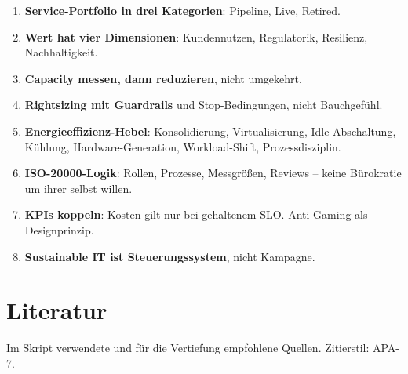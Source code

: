 \documentclass[11pt,a4paper,oneside]{article}
\begin{document}
\begin{enumerate}
  \item \textbf{Service-Portfolio in drei Kategorien}: Pipeline, Live, Retired.
  \item \textbf{Wert hat vier Dimensionen}: Kundennutzen, Regulatorik, Resilienz, Nachhaltigkeit.
  \item \textbf{Capacity messen, dann reduzieren}, nicht umgekehrt.
  \item \textbf{Rightsizing mit Guardrails} und Stop-Bedingungen, nicht Bauchgefühl.
  \item \textbf{Energieeffizienz-Hebel}: Konsolidierung, Virtualisierung, Idle-Abschaltung, Kühlung, Hardware-Generation, Workload-Shift, Prozessdisziplin.
  \item \textbf{ISO-20000-Logik}: Rollen, Prozesse, Messgrößen, Reviews -- keine Bürokratie um ihrer selbst willen.
  \item \textbf{KPIs koppeln}: Kosten gilt nur bei gehaltenem SLO. Anti-Gaming als Designprinzip.
  \item \textbf{Sustainable IT ist Steuerungssystem}, nicht Kampagne.
\end{enumerate}

\clearpage
\section{Literatur}

Im Skript verwendete und für die Vertiefung empfohlene Quellen. Zitierstil: APA-7.
\end{document}
